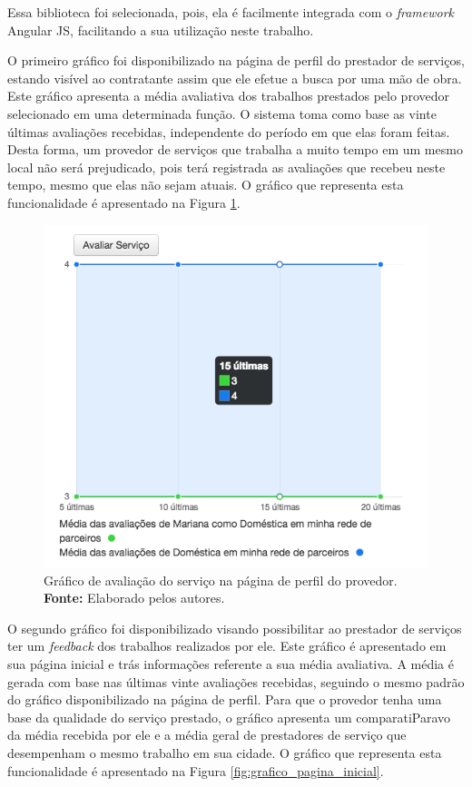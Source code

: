 \par Essa biblioteca foi selecionada, pois, ela é facilmente integrada com o \textit{framework} Angular JS, facilitando a sua utilização neste trabalho. 

\par O primeiro gráfico foi disponibilizado na página de perfil do prestador de serviços, estando visível ao contratante assim que ele efetue a busca por uma mão de obra. Este gráfico apresenta a média avaliativa dos trabalhos prestados pelo provedor selecionado em uma determinada função. O sistema toma como base as vinte últimas avaliações recebidas, independente do período em que elas foram feitas. Desta forma, um provedor de serviços que trabalha a muito tempo em um mesmo local não será prejudicado, pois terá registrada as avaliações que recebeu neste tempo, mesmo que elas não sejam atuais. O gráfico que representa esta funcionalidade é apresentado na Figura \ref{fig:grafico_pagina_perfil}.

\begin{figure}[h!]
	\centerline{\includegraphics[scale=0.65]{./imagens/grafico-pagina-perfil.png}}
	\caption[Gráfico de avaliação do serviço na página de perfil do provedor.]
	{Gráfico de avaliação do serviço na página de perfil do provedor. \textbf{Fonte:} Elaborado pelos autores.}
	\label{fig:grafico_pagina_perfil}
\end{figure}

\par O segundo gráfico foi disponibilizado visando possibilitar ao prestador de serviços ter um \textit{feedback} dos trabalhos realizados por ele. Este gráfico é apresentado em sua página inicial e trás informações referente a sua média avaliativa. A média é gerada com base nas últimas vinte avaliações recebidas, seguindo o mesmo padrão do gráfico disponibilizado na página de perfil. Para que o provedor tenha uma base da qualidade do serviço prestado, o gráfico apresenta um comparatiParavo da média recebida por ele e a média geral de prestadores de serviço que desempenham o mesmo trabalho em sua cidade. O gráfico que representa esta funcionalidade é apresentado na Figura \ref{fig:grafico_pagina_inicial}.

